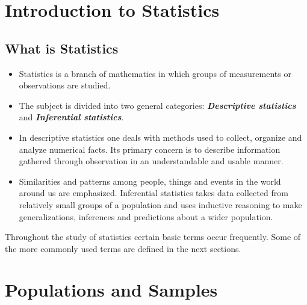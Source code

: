 \documentclass[a4paper,12pt]{article}
\begin{document}
\section{Introduction to Statistics}


\subsection*{What is Statistics}
\begin{itemize}
\item Statistics is a branch of mathematics in which groups of measurements or observations are studied. 
\item The subject is divided into two general categories: \textit{\textbf{ Descriptive statistics}} and \textit{\textbf{Inferential statistics}}. 
\item In descriptive statistics one deals with methods used to collect, organize and analyze numerical facts.
 Its primary concern is to describe information gathered through observation in an understandable and usable manner. 


\item Similarities and patterns among people, things and events in the world around us are emphasized. Inferential statistics takes data collected from relatively small groups of a population and uses inductive reasoning to make generalizations, inferences and predictions about a wider population.
\end{itemize}
Throughout the study of statistics certain basic terms occur frequently. Some of the more commonly used terms are defined in the next sections.


\section{Populations and Samples}	
\end{document}
